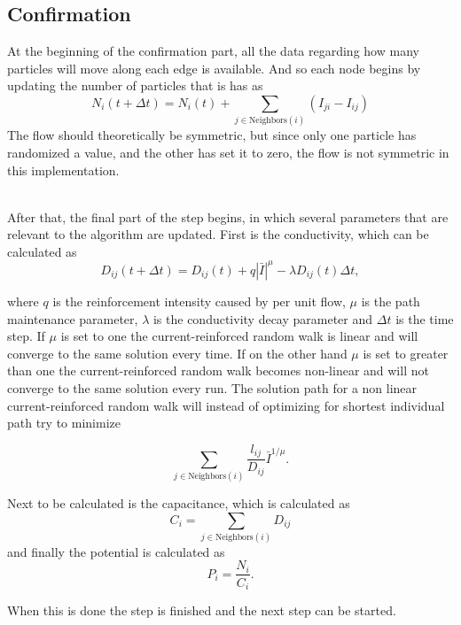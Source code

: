 \subsection{Confirmation}
At the beginning of the confirmation part, all the data regarding how many particles will move along each edge is available. And so each node begins by updating the number of particles that is has as
 \begin{equation}
 N_i(t + \Delta t) = N_i(t) + \sum_{j \in \text{Neighbors}(i)} \left( I_{ji} - I_{ij} \right)
 \end{equation}
 The flow should theoretically be symmetric, but since only one particle has randomized a value, and the other has set it to zero, the flow is not symmetric in this implementation.
 
 \ \\
 
\noindent After that, the final part of the step begins, in which several parameters that are relevant to the algorithm are updated. First is the conductivity, which can be calculated as
\begin{equation}
D_{ij}(t + \Delta t) = D_{ij}(t) + q|\bar{I}|^\mu - \lambda D_{ij}(t)\Delta t,
\end{equation}

where $q$ is the reinforcement intensity caused by per unit flow, $\mu$ is the path maintenance parameter, $\lambda$ is the conductivity decay parameter and $\Delta t$ is the time step. If $\mu$ is set to one the current-reinforced random walk is linear and will converge to the same solution every time. If on the other hand $\mu$ is set to greater than one the current-reinforced random walk becomes non-linear and will not converge to the same solution every run. The solution path for a non linear current-reinforced random walk will instead of optimizing for shortest individual path try to minimize

\begin{equation}
\sum_{j \in \text{Neighbors}(i)}\frac{l_{ij}}{D_{ij}}\bar{I}^{1/\mu}.
\end{equation}
 

Next to be calculated is the capacitance, which is calculated as 
 \begin{equation}
 C_i = \sum_{j \in \text{Neighbors}(i)} D_{ij}
 \end{equation}
 and finally the potential is calculated as
 \begin{equation}
 P_i = \frac{N_i}{C_i}.
 \end{equation}
 
 \noindent When this is done the step is finished and the next step can be started.